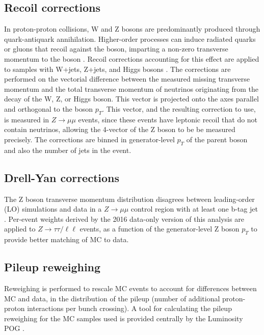     

\subsection{Recoil corrections}
\label{sec:ch-8-recoil-corrections}
In proton-proton collisions, W and Z bosons are predominantly produced through quark-antiquark annihilation. Higher-order processes can induce radiated quarks or gluons that recoil against the boson, imparting a non-zero transverse momentum to the boson \cite{2009-Tevatron-recoil-correction}. Recoil corrections accounting for this effect are applied to samples with W+jets, Z+jets, and Higgs bosons \cite{twiki_HiggsToTauTauWorkingLegacyRun2}. The corrections are performed on the vectorial difference between the measured missing transverse momentum and the total transverse momentum of neutrinos originating from the decay of the W, Z, or Higgs boson. This vector is projected onto the axes parallel and orthogonal to the boson $p_{T}$. This vector, and the resulting correction to use, is measured in $Z \rightarrow \mu\mu$ events, since these events have leptonic recoil that do not contain neutrinos, allowing the 4-vector of the Z boson to be be measured precisely. The corrections are binned in generator-level $p_{T}$ of the parent boson and also the number of jets in the event.

\subsection{Drell-Yan corrections}
The Z boson transverse momentum distribution disagrees between leading-order (LO) simulations and data in a $Z \rightarrow \mu\mu$ control region with at least one b-tag jet \cite{CMS-HIG-17-024}. Per-event weights derived by the 2016 data-only version of this analysis \cite{CMS-HIG-17-024} are applied to $Z \rightarrow \tau\tau / \ell \ell$ events, as a function of the generator-level Z boson $p_{T}$ to provide better matching of MC to data.

\subsection{Pileup reweighing}
Reweighing is performed to rescale MC events to account for differences between MC and data, in the distribution of the pileup (number of additional proton-proton interactions per bunch crossing). A tool for calculating the pileup reweighing for the MC samples used is provided centrally by the Luminosity POG \cite{twiki_LUMI_POG_recommendation}.

